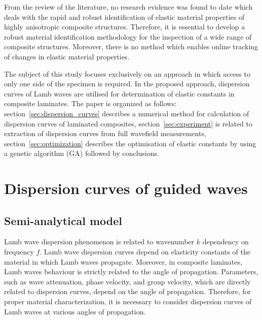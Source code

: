 \documentclass[preprint,12pt]{elsarticle}
\begin{document}
	From the review of the literature, no research evidence was found to date which deals with the rapid and robust identification of elastic material properties of highly anisotropic composite structures. Therefore, it is essential to develop a robust material identification methodology for the inspection of a wide range of composite structures. Moreover, there is no method which enables online tracking of changes in elastic material properties.
	
	The subject of this study focuses exclusively on an approach in which access to only one side of the specimen is required. In the proposed approach, dispersion curves of Lamb waves are utilised for determination of elastic constants in composite laminates. The paper is organized as follows: section~\ref{sec:dispersion_curves} describes a numerical method for calculation of dispersion curves of laminated composites, section~\ref{sec:experiment} is related to extraction of dispersion curves from full wavefield measurements, section~\ref{sec:optimization} describes the optimisation of elastic constants by using a genetic algorithm (GA) followed by conclusions.
	
	
	\section{Dispersion curves of guided waves \label{sec:dispersion_curves}}
	\subsection{Semi-analytical model}
	Lamb wave dispersion phenomenon is related to wavenumber  \(k\) dependency on 
	frequency \(f\). Lamb wave dispersion curves depend on elasticity constants of the 
	material in which Lamb waves propagate. Moreover, in composite laminates, Lamb 
	waves behaviour is strictly related to the angle of propagation. Parameters, such as 
	wave attenuation, phase velocity, and group velocity, which are directly related to 
	dispersion curves, depend on the angle of propagation. Therefore, for proper material 
	characterization, it is necessary to consider dispersion curves of Lamb waves at 
	various angles of propagation.
	
\end{document}
